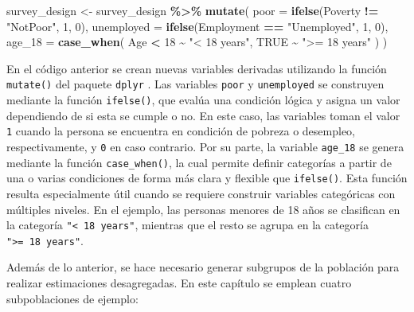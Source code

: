 \documentclass[
  spanish,
  12pt,
]{book}
\newenvironment{Shaded}{\begin{snugshade}}{\end{snugshade}}
\newcommand{\AttributeTok}[1]{\textcolor[rgb]{0.13,0.29,0.53}{#1}}
\newcommand{\ConstantTok}[1]{\textcolor[rgb]{0.56,0.35,0.01}{#1}}
\newcommand{\DecValTok}[1]{\textcolor[rgb]{0.00,0.00,0.81}{#1}}
\newcommand{\FunctionTok}[1]{\textcolor[rgb]{0.13,0.29,0.53}{\textbf{#1}}}
\newcommand{\NormalTok}[1]{#1}
\newcommand{\OtherTok}[1]{\textcolor[rgb]{0.56,0.35,0.01}{#1}}
\newcommand{\SpecialCharTok}[1]{\textcolor[rgb]{0.81,0.36,0.00}{\textbf{#1}}}
\newcommand{\StringTok}[1]{\textcolor[rgb]{0.31,0.60,0.02}{#1}}
\begin{document}
\begin{Shaded}
\begin{Highlighting}[]
\NormalTok{survey\_design }\OtherTok{\textless{}{-}}\NormalTok{ survey\_design }\SpecialCharTok{\%\textgreater{}\%}
  \FunctionTok{mutate}\NormalTok{(}
    \AttributeTok{poor =} \FunctionTok{ifelse}\NormalTok{(Poverty }\SpecialCharTok{!=} \StringTok{"NotPoor"}\NormalTok{, }\DecValTok{1}\NormalTok{, }\DecValTok{0}\NormalTok{),}
    \AttributeTok{unemployed =} \FunctionTok{ifelse}\NormalTok{(Employment }\SpecialCharTok{==} \StringTok{"Unemployed"}\NormalTok{, }\DecValTok{1}\NormalTok{, }\DecValTok{0}\NormalTok{),}
    \AttributeTok{age\_18 =} \FunctionTok{case\_when}\NormalTok{(}
\NormalTok{      Age }\SpecialCharTok{\textless{}} \DecValTok{18} \SpecialCharTok{\textasciitilde{}} \StringTok{"\textless{} 18 years"}\NormalTok{,}
      \ConstantTok{TRUE} \SpecialCharTok{\textasciitilde{}} \StringTok{"\textgreater{}= 18 years"}
\NormalTok{    )}
\NormalTok{  )}
\end{Highlighting}
\end{Shaded}

En el código anterior se crean nuevas variables derivadas utilizando la función \texttt{mutate()} del paquete \texttt{dplyr} \citep{dplyr2026}. Las variables \texttt{poor} y \texttt{unemployed} se construyen mediante la función \texttt{ifelse()}, que evalúa una condición lógica y asigna un valor dependiendo de si esta se cumple o no. En este caso, las variables toman el valor \texttt{1} cuando la persona se encuentra en condición de pobreza o desempleo, respectivamente, y \texttt{0} en caso contrario. Por su parte, la variable \texttt{age\_18} se genera mediante la función \texttt{case\_when()}, la cual permite definir categorías a partir de una o varias condiciones de forma más clara y flexible que \texttt{ifelse()}. Esta función resulta especialmente útil cuando se requiere construir variables categóricas con múltiples niveles. En el ejemplo, las personas menores de 18 años se clasifican en la categoría \texttt{"\textless{}\ 18\ years"}, mientras que el resto se agrupa en la categoría \texttt{"\textgreater{}=\ 18\ years"}.

Además de lo anterior, se hace necesario generar subgrupos de la población para realizar estimaciones desagregadas. En este capítulo se emplean cuatro subpoblaciones de ejemplo:
\end{document}
